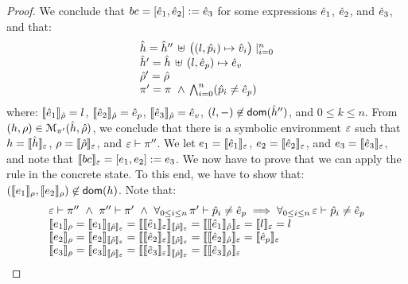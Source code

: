 \begin{proof}
\noindent{}
We conclude that  $\bcmd = [\sexpr_1, \sexpr_2] := \sexpr_3$ for some expressions $\sexpr_1$, $\sexpr_2$, 
and $\sexpr_3$, and that: 
$$
\begin{array}{l}
  \sheap =   \sheap'' \, \uplus \, \big((l, \sexprp_i) \mapsto \sexprv_i\big)\mid_{i = 0}^n     \\
  \sheap' =  \sheap \, \uplus \,  (l, \sexpr_p) \mapsto \sexpr_v  \\
  \sstore' = \sstore \\ 
    \pc' = \pc \ \wedge \, \bigwedge_{i = 0}^n (\sexprp_i \neq \sexpr_p)
\end{array}
$$ 
where: $\symbeval{\sexpr_1}{\sstore} =  \loc$, $\symbeval{\sexpr_2}{\sstore} =  \sexpr_p$, 
$\symbeval{\sexpr_3}{\sstore} =  \sexpr_v$,  $(\loc, -) \not\in \domain(\sheap'')$, 
and $0 \leq k \leq n$. 
From $(\heap, \store) \in \smodels{\sheap, \sstore}{\pc'}$, we conclude that there is a symbolic environment
$\senv$ such that $\heap = \semexpr{\sheap}{\senv}$, $\store = \semexpr{\sstore}{\senv}$, and 
$\senv \vdash \pc''$. 
We let $\jsilexpr_1 = \symbeval{\sexpr_1}{\senv}$, 
$\jsilexpr_2 = \symbeval{\sexpr_2}{\senv}$, and $\jsilexpr_3 = \symbeval{\sexpr_3}{\senv}$, and note that $\symbeval{\bcmd}{\senv} = [\jsilexpr_1, \jsilexpr_2] := \jsilexpr_3$.
We now have to prove that we can apply the  rule in the concrete state.
To this end, we have to show that:
$(\symbeval{\jsilexpr_1}{\store}, \symbeval{\jsilexpr_2}{\store}) \not\in \domain(\heap)$. 
Note that: 
$$
\begin{array}{l}
%
\senv \vdash \pc'' \ \wedge \ \pc'' \vdash \pc' \ \wedge \ \forall_{0 \leq i \leq n}  \, \pc' \vdash \sexprp_i \neq \sexpr_p  
      \implies \forall_{0 \leq i \leq n}  \, \senv \vdash \sexprp_i \neq \sexpr_p  \\
%
 \symbeval{\jsilexpr_1}{\store} = \symbeval{\jsilexpr_1}{\symbeval{\sstore}{\senv}} = \symbeval{\symbeval{\sexpr_1}{\senv}}{\symbeval{\sstore}{\senv}} = \symbeval{\symbeval{\sexpr_1}{\sstore}}{\senv} 
    = \symbeval{\loc}{\senv} = \loc \\ 
  \symbeval{\jsilexpr_2}{\store}  = \symbeval{\jsilexpr_2}{\semexpr{\sstore}{\senv}} =  \symbeval{\symbeval{\sexpr_2}{\senv}}{\symbeval{\sstore}{\senv}} = \symbeval{\symbeval{\sexpr_2}{\sstore}}{\senv}
   =  \symbeval{\sexpr_p}{\senv} \\
  \symbeval{\jsilexpr_3}{\store}  = \symbeval{\jsilexpr_3}{\semexpr{\sstore}{\senv}} =  \symbeval{\symbeval{\sexpr_3}{\senv}}{\symbeval{\sstore}{\senv}} = \symbeval{\symbeval{\sexpr_3}{\sstore}}{\senv}

\end{array}$$
\end{proof}
